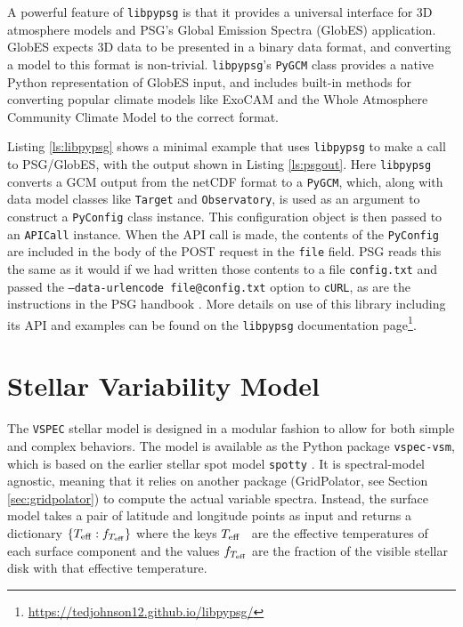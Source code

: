\documentclass[twocolumn,linenumbers]{aastex631}
\newcommand{\teff}{$T_{\rm eff}$}
\newcommand{\vspec}[1]{\texttt{VSPEC}#1}
\newcommand{\urldocslibpypsg}{\url{https://tedjohnson12.github.io/libpypsg/}}
\begin{document}
A powerful feature of \texttt{libpypsg} is that it provides a universal interface for 3D atmosphere models and PSG's Global Emission Spectra (GlobES) application.
GlobES expects 3D data to be presented in a binary data format, and converting a model to this format is non-trivial. \texttt{libpypsg}'s \texttt{PyGCM} class provides a native Python representation of GlobES input, and includes built-in methods for converting popular climate models like ExoCAM \citep{wolf2022} and the Whole Atmosphere Community Climate Model \citep[WACCM,][]{marsh2013} to the correct format.

Listing \ref{ls:libpypsg} shows a minimal example that uses \texttt{libpypsg} to make a call to PSG/GlobES, with the output shown in Listing \ref{ls:psgout}. Here \texttt{libpypsg} converts a GCM output from the netCDF format to a \texttt{PyGCM}, which, along with data model classes like \texttt{Target} and \texttt{Observatory}, is used as an argument to construct a \texttt{PyConfig} class instance. This configuration object is then passed to an \texttt{APICall} instance. When the API call is made, the contents of the \texttt{PyConfig} are included in the body of the POST request in the \texttt{file} field. PSG reads this the same as it would if we had written those contents to a file \texttt{config.txt} and passed the \texttt{--data-urlencode file@config.txt} option to \texttt{cURL}, as are the instructions in the PSG handbook \citep[pp. 162-163]{villanueva2022}. More details on use of this library including its API and examples can be found on the \texttt{libpypsg} documentation page\footnote{\urldocslibpypsg}.


\section{Stellar Variability Model}
\label{sec:star}

The \vspec{} stellar model is designed in a modular fashion to allow for both simple and complex behaviors. The model is available as the Python package \texttt{vspec-vsm}, which is based on the earlier stellar spot model \texttt{spotty} \citep{barclay2021}. It is spectral-model agnostic, meaning that it relies on another package (GridPolator, see Section \ref{sec:gridpolator}) to compute the actual variable spectra. Instead, the surface model takes a pair of latitude and longitude points as input and returns a dictionary $\{ T_{\rm eff} : f_{T_{\rm eff}} \}$ where the keys \teff~ are the effective temperatures of each surface component and the values $f_{T_{\rm eff}}$ are the fraction of the visible stellar disk with that effective temperature.
\end{document}
